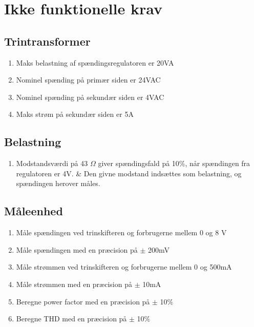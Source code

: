 
\section{Ikke funktionelle krav}

\subsection{Trintransformer}
\begin{enumerate}
	\item Maks belastning af spændingsregulatoren er 20VA
	\item Nominel spænding på primær siden er 24VAC
	\item Nominel spænding på sekundær siden er 4VAC
	\item Maks strøm på sekundær siden er 5A	
\end{enumerate}

\subsection{Belastning}
\begin{enumerate}
	\item Modstandsværdi på 43 $\Omega$ giver spændingsfald på 10\%, når spændingen fra regulatoren er 4V. & Den givne modstand indsættes som belastning, og spændingen herover måles.
\end{enumerate}

\subsection{Måleenhed}
\begin{enumerate}
	\item Måle spændingen ved trinskifteren og forbrugerne mellem 0 og 8 V
	\item Måle spændingen med en præcision på $\pm$ 200mV
	\item Måle strømmen ved trinskifteren og forbrugerne mellem 0 og 500mA
	\item Måle strømmen med en præcision på $\pm$ 10mA 
	\item Beregne power factor med en præcision på $\pm$ 10$\%$
	\item Beregne THD med en præcision på $\pm$ 10$\%$
\end{enumerate}


